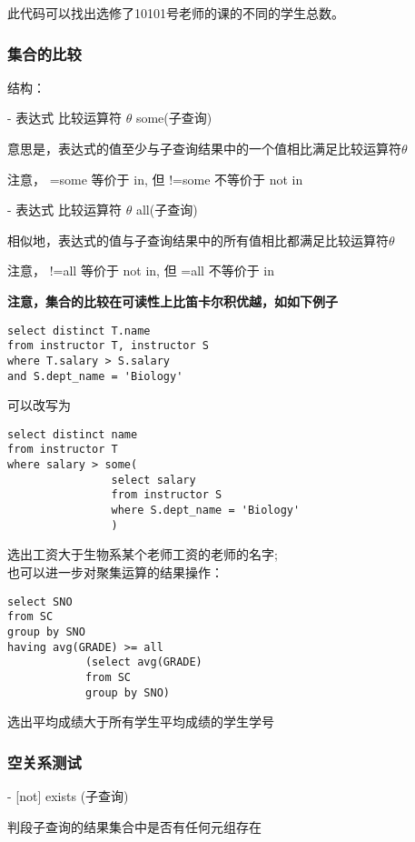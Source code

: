 \documentclass{article}        %
\begin{document}
此代码可以找出选修了10101号老师的课的不同的学生总数。

\subsubsection{集合的比较}

结构：

- 表达式 比较运算符 $\theta$ some(子查询)

意思是，表达式的值至少与子查询结果中的一个值相比满足比较运算符$\theta$

注意， =some 等价于 in, 但 !=some 不等价于 not in

- 表达式 比较运算符 $\theta$ all(子查询)

相似地，表达式的值与子查询结果中的所有值相比都满足比较运算符$\theta$

注意， !=all 等价于 not in, 但 =all 不等价于 in

\textbf{注意，集合的比较在可读性上比笛卡尔积优越，如如下例子}

\begin{verbatim} 
select distinct T.name 
from instructor T, instructor S
where T.salary > S.salary
and S.dept_name = 'Biology'
\end{verbatim}

可以改写为

\begin{verbatim}
select distinct name 
from instructor T 
where salary > some(
                select salary 
                from instructor S
                where S.dept_name = 'Biology'
                )
\end{verbatim}

选出工资大于生物系某个老师工资的老师的名字; \\

也可以进一步对聚集运算的结果操作：

\begin{verbatim} 
select SNO 
from SC 
group by SNO 
having avg(GRADE) >= all 
            (select avg(GRADE) 
            from SC 
            group by SNO)
\end{verbatim}

选出平均成绩大于所有学生平均成绩的学生学号

\subsubsection{空关系测试}

- [not] exists (子查询)

判段子查询的结果集合中是否有任何元组存在
\end{document}
